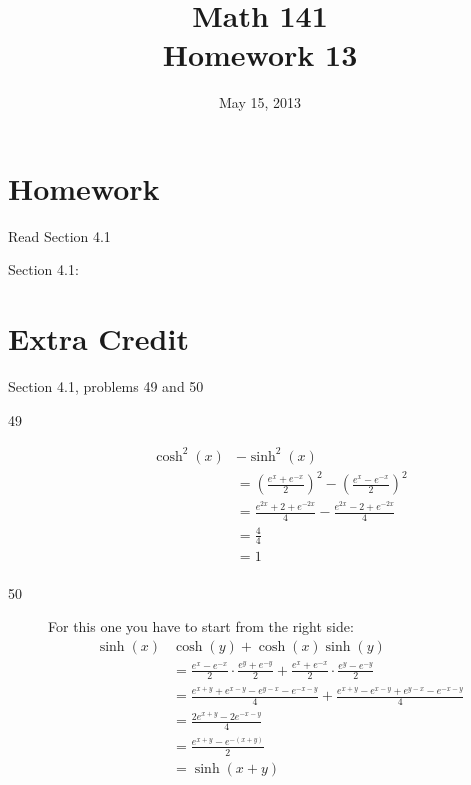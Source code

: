 \documentclass{exam}
\date{May 15, 2013}
\author{}
\title{Math 141 \\ Homework 13}
\begin{document}
  \maketitle

  \section{Homework}

  \begin{itemize*}
    \item Read Section 4.1 
    \item Section 4.1: 
  \end{itemize*}

  \section{Extra Credit}
  Section 4.1, problems 49 and 50

  \ifprintanswers
    \begin{description}
      \item[49]
        \begin{align*}
          \cosh^2(x) &- \sinh^2(x) \\
                     &= \left( \frac{e^x + e^{-x}}{2} \right)^2 - \left( \frac{e^x - e^{-x}}{2} \right)^2 \\
                     &= \frac{e^{2x} + 2 + e^{-2x}}{4} - \frac{e^{2x} - 2 + e^{-2x}}{4} \\
                     &= \frac{4}{4} \\
                     &= 1 \\
        \end{align*}

      \item[50]
        For this one you have to start from the right side:
        \begin{align*}
          \sinh(x) & \cosh(y) + \cosh(x) \sinh(y) \\
                            &= \frac{e^x - e^{-x}}{2} \cdot \frac{e^y + e^{-y}}{2} 
                                 + \frac{e^x + e^{-x}}{2} \cdot \frac{e^y - e^{-y}}{2} \\
                            &= \frac{e^{x + y} + e^{x - y} - e^{y - x} - e^{-x - y}}{4} 
                                + \frac{e^{x + y} - e^{x - y} + e^{y - x} - e^{-x - y}}{4} \\
                            &= \frac{2e^{x + y} - 2e^{-x - y}}{4} \\
                            &= \frac{e^{x + y} - e^{-(x + y)}}{2} \\
                            &= \sinh(x + y) \\
        \end{align*}
        
    \end{description}
\end{document}

